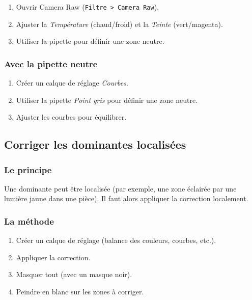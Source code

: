\begin{enumerate}
    \item Ouvrir Camera Raw (\texttt{Filtre > Camera Raw}).
    \item Ajuster la \emph{Température} (chaud/froid) et la \emph{Teinte} (vert/magenta).
    \item Utiliser la pipette pour définir une zone neutre.
\end{enumerate}

\subsubsection{Avec la pipette neutre}

\begin{enumerate}
    \item Créer un calque de réglage \emph{Courbes}.
    \item Utiliser la pipette \emph{Point gris} pour définir une zone neutre.
    \item Ajuster les courbes pour équilibrer.
\end{enumerate}

\subsection{Corriger les dominantes localisées}

\subsubsection{Le principe}

Une dominante peut être localisée (par exemple, une zone éclairée par une lumière jaune dans une pièce). Il faut alors appliquer la correction localement.

\subsubsection{La méthode}

\begin{enumerate}
    \item Créer un calque de réglage (balance des couleurs, courbes, etc.).
    \item Appliquer la correction.
    \item Masquer tout (avec un masque noir).
    \item Peindre en blanc sur les zones à corriger.
\end{enumerate}


